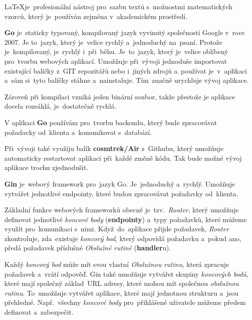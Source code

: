\documentclass[14pt,a4paper]{article}
\begin{document}
            \LaTeX je~profesionální nástroj pro~sazbu textů s~možnostmi matematických vzorců, který je~používán zejména v~akademickém prostředí.\parencite{Rybicka2003:latex}

            \textbf{Go} je~staticky typovaný, kompilovaný jazyk vyvinutý společností Google v~roce 2007. Je to~jazyk, který je~velice rychlý a~jednoduchý na~psaní.
            Protože je~kompilovaný, je~rychlý i~při~běhu. Je~to~jazyk, který je~velice oblíbený pro~tvorbu webových aplikací.
            Umožňuje při~vývoji jednoduše importovat existující balíčky z~GIT repozitářů nebo i~jiných zdrojů a~používat je~v~aplikaci a~sám
            si~tyto balíčky stáhne a~nainstaluje. Tím~značně urychluje vývoj aplikace.

            Zároveň při kompilaci vzniká jeden binární soubor, takže přestože je aplikace docela rozsáhlá, je~dostatečně rychlá.
            
            V aplikaci \textbf{Go} používám pro~tvorbu backendu, který bude zpracovávat požadavky od~klienta a~komunikovat s~databází.

            Při~vývoji také využiju balík \textbf{cosmtrek/Air} z~Githubu, který umožňuje automaticky restartovat aplikaci při~každé změně kódu.
            Tak bude možné vývoj aplikace trochu zjednodušit.

            \textbf{Gin} je~webový framework pro~jazyk Go. Je~jednoduchý a~rychlý. Umožňuje vytvářet jednotlivé endpointy,
            které budou zpracovávat požadavky od~klienta.

            Základní funkce webových frameworků obecně je~tzv.~\emph{Router}, který umožňuje definovat jednotlivé \emph{koncové body} (\textbf{endpointy}) a~typy požadavků, které můžeme využít pro~komunikaci s~nimi.
            Když~do~aplikace přijde požadavek, \emph{Router} zkontroluje, zda~existuje \emph{koncový bod}, který odpovídá požadavku a~pokud ano, předá požadavek příslušné \emph{Obslužné rutině} (\textbf{handler}u).

            Každý \emph{koncový bod} může mít svou vlastní \emph{Obslužnou rutinu}, která zpracuje požadavek a~vrátí odpověď.
            Gin také umožňuje vytvářet skupiny \emph{koncových bodů}, které mají společný základ~URL adresy, které mohou mít společnou \emph{obslužnou rutinu}.
            To~umožňuje vytvářet aplikace, které mají jednotnou strukturu a~jsou přehledné. Např.~všechny \emph{koncové body} pro~přihlášené
            uživatele můžeme předem definovat a~zabezpečit.
            
\end{document}
